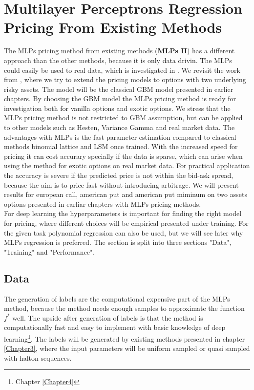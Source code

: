\section{Multilayer Perceptrons Regression Pricing From Existing Methods}
The MLPs pricing method from existing methods (\textbf{MLPs II}) has a different approach than the other methods, because it is only data drivin. The MLPs could easily be used to real data, which is investigated in \parencite{GasparRaquel20}. We revisit the work from \parencite{HirsaAli2019}, where we try to extend the pricing models to options with two underlying risky assets. The model will be the classical GBM model presented in earlier chapters. By choosing the GBM model the MLPs pricing method is ready for investigation both for vanilla options and exotic options. We stress that the MLPs pricing method is not restricted to GBM assumption, but can be applied to other models such as Hesten, Variance Gamma and real market data. The advantages with MLPs is the fast parameter estimation compared to classical methods binomial lattice and LSM once trained. With the increased speed for pricing it can cost accurary specially if the data is sparse, which can arise when using the method for exotic options on real market data. For practical application the accuracy is severe if the predicted price is not within the bid-ask spread, because the aim is to price fast without introducing arbitrage. We will present results for european call, american put and american put miminum on two assets options presented in earliar chapters with MLPs pricing methods.\\

For deep learning the hyperparameters is important for finding the right model for pricing, where different choices will be empirical presented under training. For the given task polynomial regression can also be used, but we will see later why MLPs regression is preferred. The section is split into three sections "Data", "Training" and "Performance".

\subsection{Data}
The generation of labels are the computational expensive part of the MLPs method, because the method needs enough samples to approximate the function $f^*$ well. The upside after generation of labels is that the method is computationally fast and easy to implement with basic knowledge of deep learning\footnote{Chapter \ref{Chapter4}}. The labels will be generated by existing methods presented in chapter \ref{Chapter3}, where the input parameters will be uniform sampled or quasi sampled with halton sequences.\\


